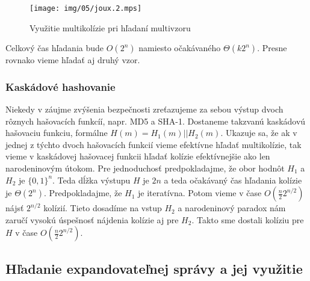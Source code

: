 \begin{figure}[h!]
    \centering
    \texttt{[image: img/05/joux.2.mps]}
    \caption{Využitie multikolízie pri hľadaní multivzoru}
    \label{fig:joux2}
\end{figure}

Celkový čas hľadania bude $O(2^n)$ namiesto očakávaného $\Theta(k 2^n)$.
Presne rovnako vieme hľadať aj druhý vzor.

\subsubsection{Kaskádové hashovanie}
Niekedy v záujme zvýšenia bezpečnosti zreťazujeme za sebou výstup
dvoch rôznych hašovacích funkcíí, napr.
MD5 a SHA-1. Dostaneme takzvanú kaskádovú hašovaciu funkciu,
formálne $H(m) = H_1(m)||H_2(m)$. 
Ukazuje sa, že ak v jednej z týchto dvoch hašovacích funkcií
vieme efektívne hľadať multikolízie, tak vieme
v kaskádovej hašovacej funkcii hľadať kolízie efektívnejšie
ako len narodeninovým útokom.
Pre jednoduchosť predpokladajme, že obor hodnôt $H_1$
a $H_2$ je $\{0,1\}^n$. Teda dĺžka výstupu $H$ je $2n$ a teda
očakávaný čas hľadania kolízie je $\Theta(2^n)$.
Predpokladajme, že $H_1$ je iteratívna. Potom vieme v čase 
$O(\frac{n}{2} 2^{n/2})$ nájsť $2^{n/2}$ kolízií. Tieto dosadíme
na vstup $H_2$ a narodeninový paradox nám zaručí
vysokú úspešnosť nájdenia kolízie aj pre $H_2$. Takto sme dostali
kolíziu pre $H$ v čase $O(\frac{n}{2} 2^{n/2})$.

\subsection{Hľadanie expandovateľnej správy a jej využitie}

